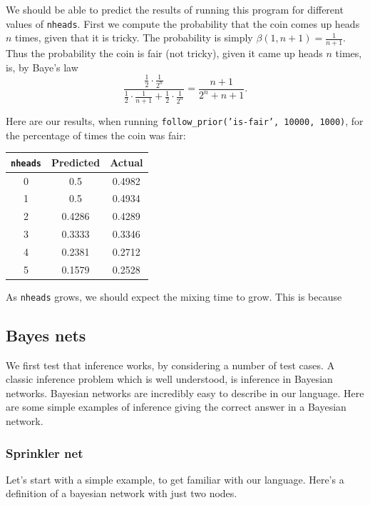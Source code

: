 \documentclass[11pt]{article}
\begin{document}

We should be able to predict the results of running this program for different values of {\tt nheads}.  First we compute the probability that the coin comes up heads $n$ times, given that it is tricky.  The probability is simply $\beta(1, n + 1) = \frac{1}{n +1}$.  Thus the probability the coin is fair (not tricky), given it came up heads $n$ times, is, by Baye's law $$\frac{\frac{1}{2} \cdot \frac{1}{2^n}}{\frac{1}{2} \cdot \frac{1}{n+1} + \frac{1}{2} \cdot \frac{1}{2^n}} = \frac{n+1}{ 2^n + n+1}.$$

Here are our results, when running {\tt follow\_prior('is-fair', 10000, 1000)}, for the percentage of times the coin was fair:  

\begin{center}
\begin{tabular}{|c | c| c |} \hline
{\tt nheads} & Predicted & Actual \\ \hline
0 & 0.5 & 0.4982\\ \hline
1 & 0.5 & 0.4934 \\ \hline
2 & 0.4286 &  0.4289 \\ \hline
3 & 0.3333 &  0.3346 \\ \hline
4 & 0.2381 &  0.2712 \\ \hline
5 & 0.1579 &  0.2528 \\ \hline
\end{tabular}
\end{center}

As {\tt nheads} grows, we should expect the mixing time to grow.  This is because 
\subsection{Bayes nets}

We first test that inference works, by considering a number of test cases.  A classic inference problem which is well understood, is inference in Bayesian networks.  Bayesian networks are incredibly easy to describe in our language.  Here are some simple examples of inference giving the correct answer in a Bayesian network.

\subsubsection{Sprinkler net}

Let's start with a simple example, to get familiar with our language.   Here's a definition of a bayesian network with just two nodes.
\end{document}
